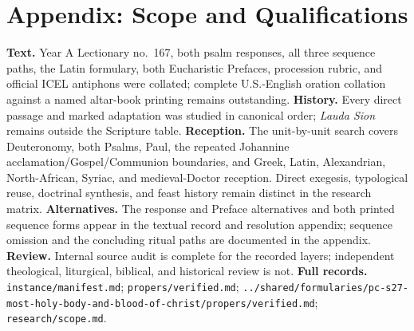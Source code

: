 \section*{Appendix: Scope and Qualifications}

\begin{studyframe}
\textbf{Text.} Year A Lectionary no.~167, both psalm responses, all three sequence paths, the Latin formulary, both Eucharistic Prefaces, procession rubric, and official ICEL antiphons were collated; complete U.S.-English oration collation against a named altar-book printing remains outstanding. \textbf{History.} Every direct passage and marked adaptation was studied in canonical order; \emph{Lauda Sion} remains outside the Scripture table. \textbf{Reception.} The unit-by-unit search covers Deuteronomy, both Psalms, Paul, the repeated Johannine acclamation/Gospel/Communion boundaries, and Greek, Latin, Alexandrian, North-African, Syriac, and medieval-Doctor reception. Direct exegesis, typological reuse, doctrinal synthesis, and feast history remain distinct in the research matrix. \textbf{Alternatives.} The response and Preface alternatives and both printed sequence forms appear in the textual record and resolution appendix; sequence omission and the concluding ritual paths are documented in the appendix. \textbf{Review.} Internal source audit is complete for the recorded layers; independent theological, liturgical, biblical, and historical review is not. \textbf{Full records.} \nolinkurl{instance/manifest.md}; \nolinkurl{propers/verified.md}; \nolinkurl{../shared/formularies/pc-s27-most-holy-body-and-blood-of-christ/propers/verified.md}; \nolinkurl{research/scope.md}.
\end{studyframe}

